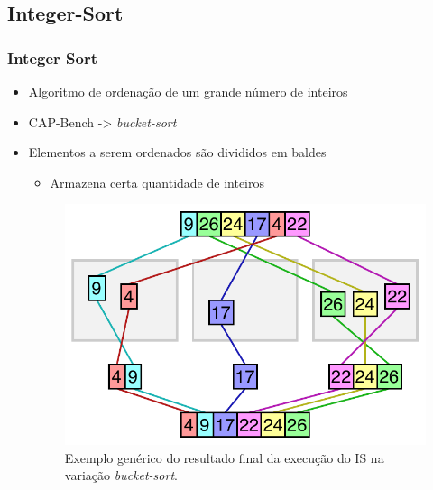 \documentclass[xcolor={table}]{beamer}
\begin{document}
\subsection{Integer-Sort}
\begin{frame}\frametitle{Integer Sort}
    \begin{itemize}
        \item {Algoritmo de ordenação de um grande número de inteiros}
        \item {CAP-Bench -> \textit{bucket-sort}}
        \item {Elementos a serem ordenados são divididos em baldes}
        \begin{itemize}
            \item {Armazena certa quantidade de inteiros}
        \end{itemize}
        \begin{figure}
            \centering
            \includegraphics[width=.6\linewidth, keepaspectratio]{figs/bucket-sort.pdf}
            \caption{Exemplo genérico do resultado final da execução do IS na variação \textit{bucket-sort}.}
            \label{fig:bucketsort}
        \end{figure}
    \end{itemize}
\end{frame}
\end{document}
